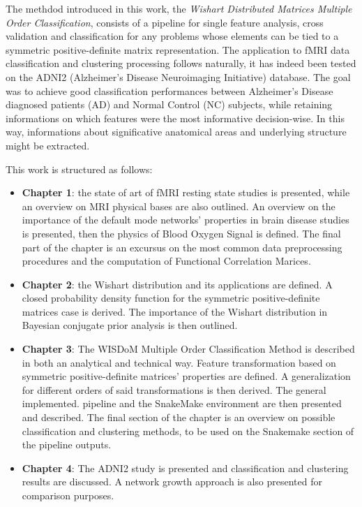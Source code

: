 \documentclass[12pt,openright,twoside,a4paper]{book}
\begin{document}
The methdod introduced in this work, the \textit{Wishart Distributed Matrices Multiple Order Classification}, consists of a pipeline for single feature analysis, cross validation and classification for any problems whose elements can be tied to a symmetric positive-definite matrix representation.
The application to fMRI data classification and clustering processing follows naturally, it has indeed been tested on the ADNI2 (Alzheimer's Disease Neuroimaging Initiative) database.
The goal was to achieve good classification performances between  Alzheimer's Disease diagnosed patients (AD) and Normal Control (NC) subjects, while retaining informations on which features were the most informative decision-wise.
In this way, informations about significative anatomical areas and underlying structure might be extracted.

This work is structured as follows:
\begin{itemize}
\item \textbf{Chapter 1}: the state of art of fMRI resting state studies is presented, while an overview on MRI physical bases are also outlined.
An overview on the importance of the default mode networks' properties in brain disease studies is presented, then the physics of Blood Oxygen Signal is defined.
The final part of the chapter is an excursus on the most common data preprocessing procedures and the computation of Functional Correlation Marices.

\item \textbf{Chapter 2}: the Wishart distribution and its applications are defined.
A closed probability density function for the symmetric positive-definite matrices case is derived.
The importance of the Wishart distribution in Bayesian conjugate prior analysis is then outlined.

\item \textbf{Chapter 3}: The WISDoM Multiple Order Classification Method is described in both an analytical and technical way.
Feature transformation based on symmetric positive-definite matrices' properties are defined.
A generalization for different orders of said transformations is then derived.
The general implemented. pipeline and the SnakeMake environment are then presented and described.
The final section of the chapter is an overview on possible classification and clustering methods, to be used on the Snakemake section of the pipeline outputs.

\item \textbf{Chapter 4}: The ADNI2 study is presented and classification and clustering results are discussed. A network growth approach is also presented for comparison purposes.
\end{itemize}
\end{document}
